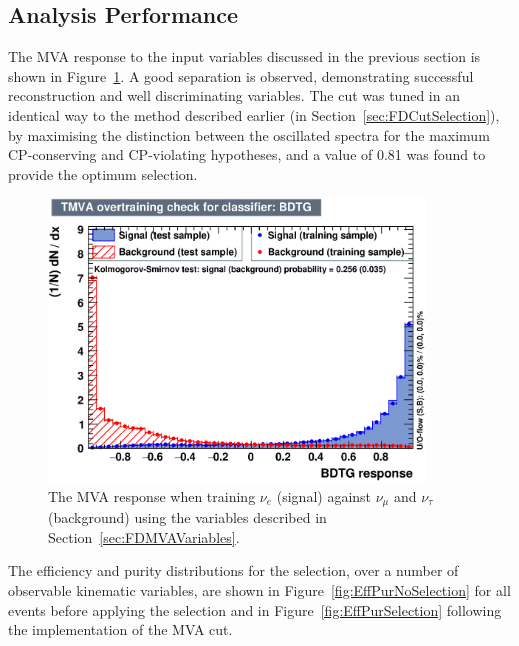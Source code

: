 \subsection{Analysis Performance}\label{sec:FDMVAPerformance}

The MVA response to the input variables discussed in the previous section is shown in Figure~\ref{fig:MVAResponse}.  A good separation is observed, demonstrating successful reconstruction and well discriminating variables.  The cut was tuned in an identical way to the method described earlier (in Section~\ref{sec:FDCutSelection}), by maximising the distinction between the oscillated spectra for the maximum CP-conserving and CP-violating hypotheses, and a value of 0.81 was found to provide the optimum selection.

\begin{figure}
  \centering
  \includegraphics[width=10cm]{NuECCMVAOvertrainBDT.eps}
  \caption[The MVA response when training $\nu_e$ (signal) against $\nu_{\mu}$ and $\nu_{\tau}$ (background).]{The MVA response when training $\nu_e$ (signal) against $\nu_{\mu}$ and $\nu_{\tau}$ (background) using the variables described in Section~\ref{sec:FDMVAVariables}.}
  \label{fig:MVAResponse}
\end{figure}

The efficiency and purity distributions for the selection, over a number of observable kinematic variables, are shown in Figure~\ref{fig:EffPurNoSelection} for all events before applying the selection and in Figure~\ref{fig:EffPurSelection} following the implementation of the MVA cut.

